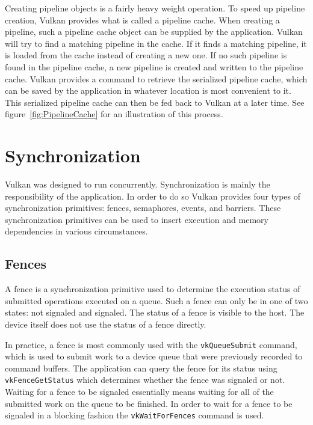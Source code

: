       Creating pipeline objects is a fairly heavy weight operation. To speed up pipeline creation, Vulkan provides what is called a pipeline cache. When creating a pipeline, such a pipeline cache object can be supplied by the application. Vulkan will try to find a matching pipeline in the cache. If it finds a matching pipeline, it is loaded from the cache instead of creating a new one. If no such pipeline is found in the pipeline cache, a new pipeline is created and written to the pipeline cache. Vulkan provides a command to retrieve the serialized pipeline cache, which can be saved by the application in whatever location is most convenient to it. This serialized pipeline cache can then be fed back to Vulkan at a later time. See figure~\ref{fig:PipelineCache} for an illustration of this process.


  \section{Synchronization}

    Vulkan was designed to run concurrently. Synchronization is mainly the responsibility of the application. In order to do so Vulkan provides four types of synchronization primitives: fences, semaphores, events, and barriers. These synchronization primitives can be used to insert execution and memory dependencies in various circumstances.


    \subsection{Fences}
    \label{sub:Fences}
      A fence is a synchronization primitive used to determine the execution status of submitted operations executed on a queue. Such a fence can only be in one of two states: not signaled and signaled. The status of a fence is visible to the host. The device itself does not use the status of a fence directly.

      In practice, a fence is most commonly used with the \lstinline{vkQueueSubmit} command, which is used to submit work to a device queue that were previously recorded to command buffers. The application can query the fence for its status using \lstinline{vkFenceGetStatus} which determines whether the fence was signaled or not. Waiting for a fence to be signaled essentially means waiting for all of the submitted work on the queue to be finished. In order to wait for a fence to be signaled in a blocking fashion the \lstinline{vkWaitForFences} command is used.

